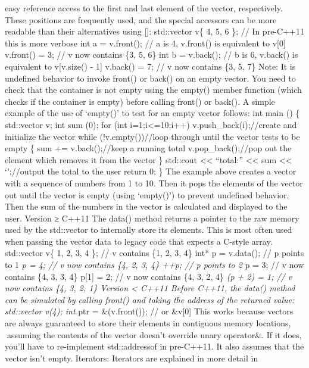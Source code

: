 easy reference access to the ﬁrst and last element of the vector,
respectively. These positions are frequently used, and the special
accessors can be more readable than their alternatives using {[}{]}:
std::vector v\{ 4, 5, 6 \}; // In pre-C++11 this is more verbose int a =
v.front(); // a is 4, v.front() is equivalent to v{[}0{]} v.front() = 3;
// v now contains \{3, 5, 6\} int b = v.back(); // b is 6, v.back() is
equivalent to v{[}v.size() - 1{]} v.back() = 7; // v now contains \{3,
5, 7\} Note: It is undeﬁned behavior to invoke front() or back() on an
empty vector. You need to check that the container is not empty using
the empty() member function (which checks if the container is empty)
before calling front() or back(). A simple example of the use of
`empty()' to test for an empty vector follows: int main () \{
std::vector v; int sum (0); for (int i=1;i\textless=10;i++)
v.push\_back(i);//create and initialize the vector while
(!v.empty())//loop through until the vector tests to be empty \{ sum +=
v.back();//keep a running total v.pop\_back();//pop out the element
which removes it from the vector \} std::cout \textless\textless{}
``total:'' \textless\textless{} sum \textless\textless{} `\n';//output
the total to the user return 0; \} The example above creates a vector
with a sequence of numbers from 1 to 10. Then it pops the elements of
the vector out until the vector is empty (using `empty()') to prevent
undeﬁned behavior. Then the sum of the numbers in the vector is
calculated and displayed to the user. Version ≥ C++11 The data() method
returns a pointer to the raw memory used by the std::vector to
internally store its elements. This is most often used when passing the
vector data to legacy code that expects a C-style array. std::vector v\{
1, 2, 3, 4 \}; // v contains \{1, 2, 3, 4\} int* p = v.data(); // p
points to 1 \emph{p = 4; // v now contains \{4, 2, 3, 4\} ++p; // p
points to 2 }p = 3; // v now contains \{4, 3, 3, 4\} p{[}1{]} = 2; // v
now contains \{4, 3, 2, 4\} \emph{(p + 2) = 1; // v now contains \{4, 3,
2, 1\} Version \textless{} C++11 Before C++11, the data() method can be
simulated by calling front() and taking the address of the returned
value: std::vector v(4); int} ptr = \&(v.front()); // or \&v{[}0{]} This
works because vectors are always guaranteed to store their elements in
contiguous memory locations, assuming the contents of the vector
doesn't override unary operator\&. If it does, you'll have to
re-implement std::addressof in pre-C++11. It also assumes that the
vector isn't empty. Iterators: Iterators are explained in more detail in
